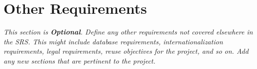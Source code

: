 
\section{Other Requirements}\label{sec:other-requirements}
    \emph{This section is \textbf{Optional}. Define any other requirements not covered elsewhere in the SRS. This might include database requirements, internationalization requirements, legal requirements, reuse objectives for the project, and so on. Add any new sections that are pertinent to the project.}
